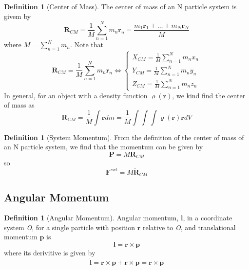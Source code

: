 \documentclass[12pt]{article}
\theoremstyle{definition}
\newtheorem{defn}[thm]{Definition}
\theoremstyle{remark}
\numberwithin{equation}{section}
\newcommand\B[1]{\textbf{#1}}
\begin{document}
\begin{defn}[Center of Mass]
        The center of mass of an N particle system is givem by \begin{equation}
                \B{R}_{CM} = \frac{1}{M}\sum\limits_{n=1}^Nm_n\B{r}_n = \frac{m_1\B{r}_1+\hdots+m_N\B{r}_N}{M}
        \end{equation}
        where $M = \sum_{n=1}^Nm_n$. Note that 
        \begin{equation}
                \B{R}_{CM} =  \frac{1}{M}\sum\limits_{n=1}^Nm_n\B{r}_n \iff \left\{\begin{array}{c}
                        X_{CM} = \frac{1}{M}\sum\limits_{n=1}^Nm_nx_n \\
                        Y_{CM} = \frac{1}{M}\sum\limits_{n=1}^Nm_ny_n \\
                        Z_{CM} = \frac{1}{M}\sum\limits_{n=1}^Nm_nz_n                \end{array}\right.
        \end{equation}
        In general, for an object with a density function $\boldsymbol{\varrho(r)}$, we kind find the center of mass as \begin{equation}
                \B{R}_{CM} = \frac{1}{M}\int\B{r}dm = \frac{1}{M}\int\int\int\boldsymbol{\varrho(r)}\B{r}dV
        \end{equation}
\end{defn}

\vspace{15pt}

\begin{defn}[System Momentum]
        From the definition of the center of mass of an N particle system, we find that the momentum can be given by \begin{equation}
                \B{P} = M\B{R}_{CM}
        \end{equation}
        so \begin{equation}
                \B{F}^{ext} = M\ddot{\B{R}}_{CM}
        \end{equation}
\end{defn}

\vspace{15pt}


\subsection{Angular Momentum}

\begin{defn}[Angular Momentum]
        Angular momentum, $\B{l}$, in a coordinate system \emph{O}, for a single particle with position $\B{r}$ relative to \emph{O}, and translational momentum $\B{p}$ is \begin{equation}
                \B{l} = \B{r}\times \B{p}
        \end{equation}
        where its derivitive is given by \begin{equation}
                \dot{\B{l}} = \dot{\B{r}}\times \B{p} + \B{r}\times \dot{\B{p}} = \B{r}\times \dot{\B{p}}
        \end{equation}
\end{defn}
\end{document}
